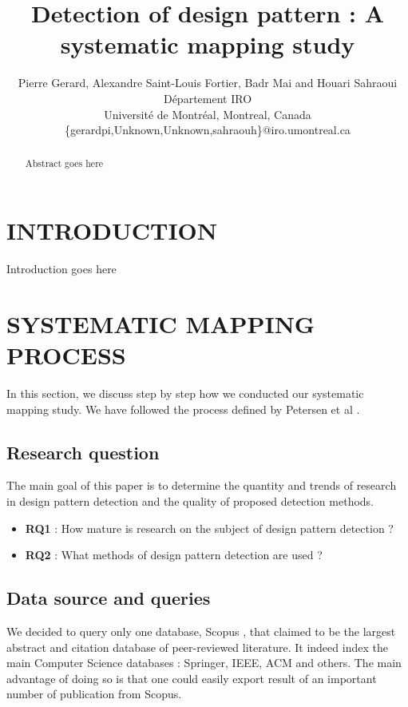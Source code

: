 \documentclass[letterpaper, 10 pt, conference]{ieeeconf}  %
\title{\LARGE \bf
Detection of design pattern : A systematic mapping study}
\author{Pierre Gerard, Alexandre Saint-Louis Fortier, Badr Mai and Houari Sahraoui \\
Département IRO \\
Université de Montréal, Montreal, Canada \\
\{gerardpi,Unknown,Unknown,sahraouh\}@iro.umontreal.ca
}
\begin{document}
\maketitle
\thispagestyle{empty}
\pagestyle{empty}


\begin{abstract}

Abstract goes here

\end{abstract}


\section{INTRODUCTION}

Introduction goes here


\section{SYSTEMATIC MAPPING PROCESS}

In this section, we discuss step by step how we conducted our systematic mapping study. We have followed the process defined by Petersen et al \cite{c1}. 

\subsection{Research question}

The main goal of this paper is to determine the quantity and trends of research in design pattern detection and the quality of proposed detection methods.
\begin{itemize}
	\item \textbf{RQ1} : How mature is research on the subject of design pattern detection ?
	\item \textbf{RQ2} : What methods of design pattern detection are used ?
\end{itemize}


\subsection{Data source and queries}

We decided to query only one database, Scopus \cite{c2}, that claimed to be the largest abstract and citation database of peer-reviewed literature. It indeed index the main Computer Science databases : Springer, IEEE, ACM and others. The main advantage of doing so is that one could easily export result of an important number of publication from Scopus.
\end{document}
